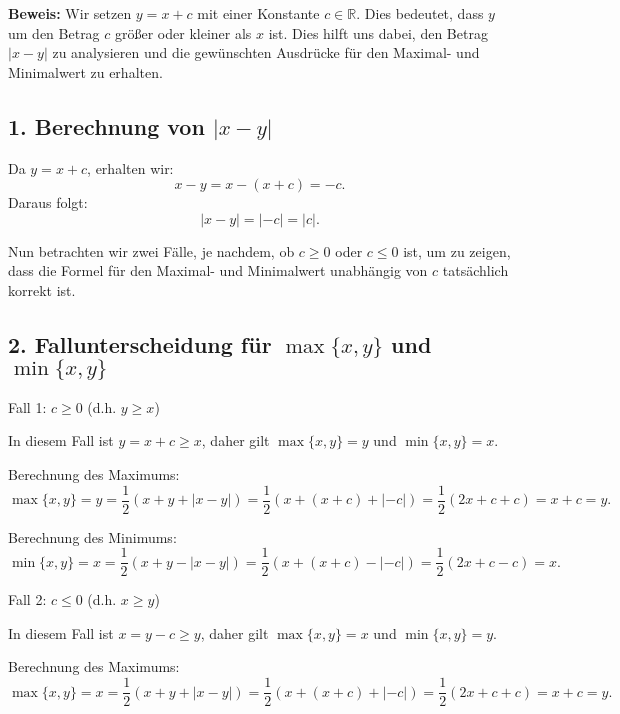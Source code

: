 \documentclass[11pt]{article}
\begin{document}
\textbf{Beweis:} Wir setzen \( y = x + c \) mit einer Konstante \( c \in \mathbb{R} \). Dies bedeutet, dass \( y \) um den Betrag \( c \) größer oder kleiner als \( x \) ist. Dies hilft uns dabei, den Betrag \( |x - y| \) zu analysieren und die gewünschten Ausdrücke für den Maximal- und Minimalwert zu erhalten.

\subsection*{1. Berechnung von \( |x - y| \)}
Da \( y = x + c \), erhalten wir:
\[
x - y = x - (x + c) = -c.
\]
Daraus folgt:
\[
|x - y| = | - c | = |c|.
\]

Nun betrachten wir zwei Fälle, je nachdem, ob \( c \geq 0 \) oder \( c \leq 0 \) ist, um zu zeigen, dass die Formel für den Maximal- und Minimalwert unabhängig von \( c \) tatsächlich korrekt ist.

\subsection*{2. Fallunterscheidung für \( \max\{x, y\} \) und \( \min\{x, y\} \)}

Fall 1: \( c \geq 0 \) (d.h. \( y \geq x \))

In diesem Fall ist \( y = x + c \geq x \), daher gilt \( \max\{x, y\} = y \) und \( \min\{x, y\} = x \).

Berechnung des Maximums:
\[
\max\{x, y\} = y = \frac{1}{2} (x + y + |x - y|) = \frac{1}{2} (x + (x + c) + | - c |) = \frac{1}{2} (2x + c + c) = x + c = y.
\]

Berechnung des Minimums:
\[
\min\{x, y\} = x = \frac{1}{2} (x + y - |x - y|) = \frac{1}{2} (x + (x + c) - | - c |) = \frac{1}{2} (2x + c - c) = x.
\]

\bigskip

Fall 2: \( c \leq 0 \) (d.h. \( x \geq y \))

In diesem Fall ist \( x = y - c \geq y \), daher gilt \( \max\{x, y\} = x \) und \( \min\{x, y\} = y \).

Berechnung des Maximums:
\[
\max\{x, y\} = x = \frac{1}{2} (x + y + |x - y|) = \frac{1}{2} (x + (x + c) + | - c |) = \frac{1}{2} (2x + c + c) = x + c = y.
\]
\end{document}
